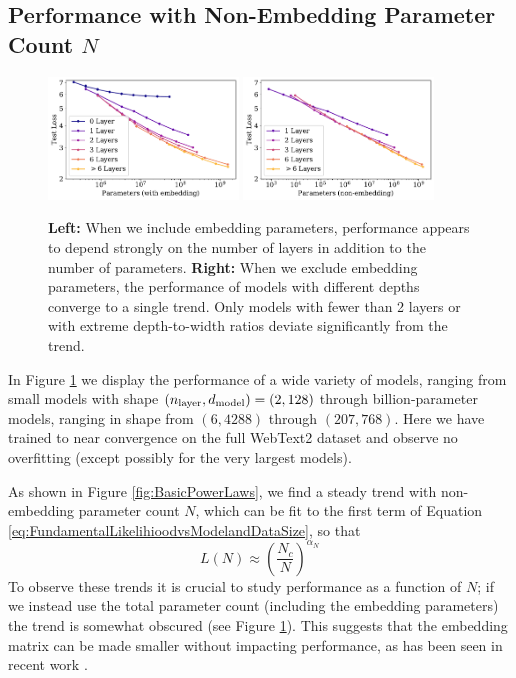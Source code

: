 \documentclass[english]{article}
\newcommand{\be}{\begin{equation}}
\newcommand{\ee}{\end{equation}}
\begin{document}
\subsection{Performance with Non-Embedding Parameter Count $N$} 
\label{sec:PerformancevsModelSize}

\begin{figure}
\noindent \centering{}
\includegraphics[width=0.45\textwidth]{PerfVsModelSizeAllParams}
\includegraphics[width=0.45\textwidth]{PerfVsModelSizeNonEmbed}
\caption[Comparison of performance trend when including or excluding embeddings]{
{\bf Left:} When we include embedding parameters, performance appears to depend strongly on the number of layers in addition to the number of parameters.
{\bf Right:} When we exclude embedding parameters, the performance of models with different depths converge to a single trend. Only models with fewer than 2 layers or with extreme depth-to-width ratios deviate significantly from the trend.  \label{fig:PerformancevsModelSizeBody}}
\end{figure}


In Figure \ref{fig:PerformancevsModelSizeBody} we display the performance of a wide variety of models, ranging from small models with shape $(n_{\rm layer}, d_{{\rm model}}) = (2, 128)$ through billion-parameter models, ranging in shape from $(6, 4288)$ through $(207, 768)$.  Here we have trained to near convergence on the full WebText2 dataset and observe no overfitting (except possibly for the very largest models).

As shown in  Figure \ref{fig:BasicPowerLaws}, we find a steady trend with non-embedding parameter count $N$, which can be fit to the first term of Equation \eqref{eq:FundamentalLikelihioodvsModelandDataSize}, so that
\be
L(N) \approx \left( \frac{N_c}{N} \right)^{ \alpha_N }
\ee  
To observe these trends it is crucial to study performance as a function of $N$; if we instead use the total parameter count (including the embedding parameters) the trend is somewhat obscured (see Figure \ref{fig:PerformancevsModelSizeBody}).  This suggests that the embedding matrix can be made smaller without impacting performance, as has been seen in recent work \cite{lan2019albert}.
\end{document}

